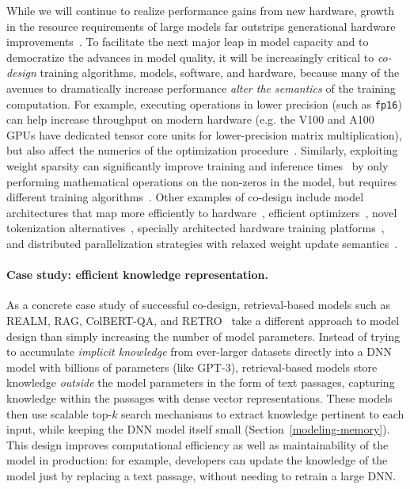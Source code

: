 While we will continue to realize performance gains from new hardware, growth in the resource requirements of large models far outstrips generational hardware improvements~\citep{brown2020gpt3}. To facilitate the next major leap in model capacity and to democratize the advances in model quality, it will be increasingly critical to \emph{co-design} training algorithms, models, software, and hardware, because many of the avenues to dramatically increase performance \emph{alter the semantics} of the training computation. For example, executing operations in lower precision (such as \texttt{fp16}) can help increase throughput on modern hardware (e.g. the V100 and A100 GPUs have dedicated tensor core units for lower-precision matrix multiplication), but also affect the numerics of the optimization procedure~\citep{micikevicius2017mixed}. Similarly, exploiting weight sparsity can significantly improve training and inference times~\citep{Elsen_2020_CVPR, gale2020sparse} by only performing mathematical operations on the non-zeros in the model, but requires different training algorithms~\citep{jayakumar2021top, pmlr-v119-evci20a, dettmers2019sparse}. Other examples of co-design include model architectures that map more efficiently to hardware~\citep{pmlr-v97-so19a, child2019generating, wang2020linformer, lee2021fnet, kitaev2020reformer,longformer, tay2020efficient, ren2021combiner}, efficient optimizers~\citep{anil2020scalable, shazeer2018adafactor}, novel tokenization alternatives~\citep{xue2021byt5, tay2021charformer}, specially architected hardware training platforms~\citep{jouppi2017datacenter, mudigere2021high, selene}, and distributed parallelization strategies with relaxed weight update semantics~\citep{narayanan2019pipedream, narayanan2021memory}.

\paragraph{Case study: efficient knowledge representation.} As a concrete case study of successful co-design, retrieval-based models such as REALM, RAG, ColBERT-QA, and RETRO~\citep{guu2020realm,lewis2020retrieval,Khattab-etal:2020:OpenQA,borgeaud2021improving} take a different approach to model design than simply increasing the number of model parameters. Instead of trying to accumulate \emph{implicit knowledge} from ever-larger datasets directly into a DNN model with billions of parameters (like GPT-3), retrieval-based models store knowledge \emph{outside} the model parameters in the form of text passages, capturing knowledge within the passages with dense vector representations. These models then use scalable top-$k$ search mechanisms to extract knowledge pertinent to each input, while keeping the DNN model itself small (Section~\ref{modeling-memory}). This design improves computational efficiency as well as maintainability of the model in production: for example, developers can update the knowledge of the model just by replacing a text passage, without needing to retrain a large DNN.

